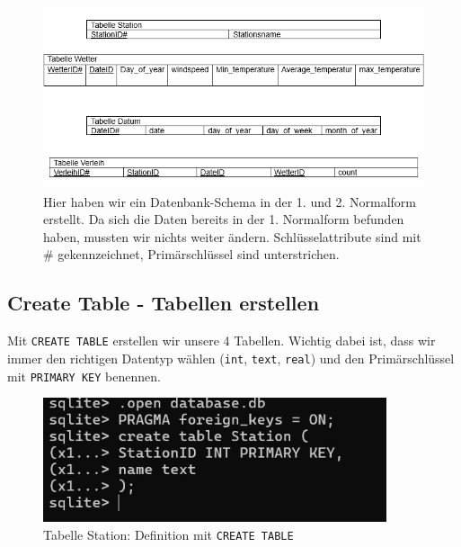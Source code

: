\documentclass{article}
\begin{document}
\begin{figure}[h!]
    \centering
    \includegraphics[width=\textwidth]{datenbankschema[1].png}
    \caption{Hier haben wir ein Datenbank-Schema in der 1. und 2. Normalform erstellt. Da sich die Daten bereits in der 1. Normalform befunden haben, mussten wir nichts weiter ändern. Schlüsselattribute sind mit \# gekennzeichnet, Primärschlüssel sind unterstrichen.}
    \label{fig:datenbankschema}
\end{figure}

\newpage 

\newpage 



\label{sec:datenbank-schema}

\subsection{Create Table - Tabellen erstellen}
\label{sec:create-table}

Mit \texttt{CREATE TABLE} erstellen wir unsere 4 Tabellen. Wichtig dabei ist, dass wir immer den richtigen Datentyp wählen (\texttt{int}, \texttt{text}, \texttt{real}) und den Primärschlüssel mit \texttt{PRIMARY KEY} benennen.

\begin{figure}[h!]
    \centering
    \includegraphics[width=0.9\textwidth]{Nummer 1.jpg}
    \caption{Tabelle Station: Definition mit \texttt{CREATE TABLE}}
    \label{fig:table-station}
\end{figure}
\end{document}
